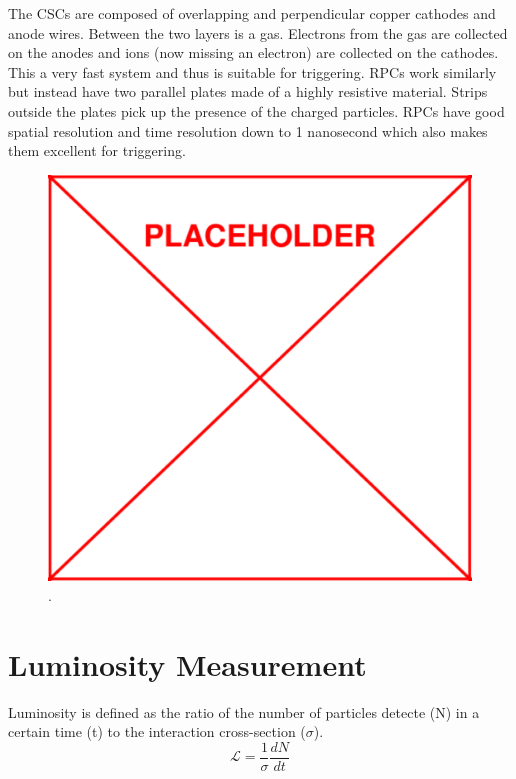 	The CSCs are composed of overlapping and perpendicular copper cathodes and anode wires. Between the two layers is a gas. Electrons from the gas are collected on the anodes and ions (now missing an electron) are collected on the cathodes. This a very fast system and thus is suitable for triggering. RPCs work similarly but instead have two parallel plates made of a highly resistive material. Strips outside the plates pick up the presence of the charged particles. RPCs have good spatial resolution and time resolution down to 1 nanosecond which also makes them excellent for triggering.\\
						\begin{figure}[h]
\begin{center}
\includegraphics[width=0.48\linewidth]{Figs/placeholder.pdf}%
\caption{\label{fig:muonchamber}
.
}
\end{center}
\end{figure}
	
		
		
	
	\section{Luminosity Measurement}	
		Luminosity is defined as the ratio of the number of particles detecte (N) in a certain time (t) to the interaction cross-section ($\sigma$). 
		\begin{equation}
		\mathcal{L} = \frac{1}{\sigma} \frac{dN}{dt}
		\end{equation}
		
